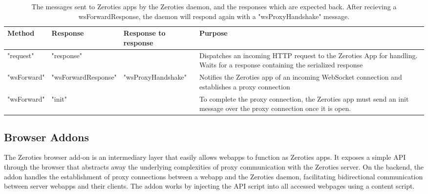 \begin{table*}[h]
    \small
    \centering
\begin{tabularx}{\textwidth}{|l|l|l|l|}
    \hline
Method      & Response            & Response to response & Purpose                                                                                                                       \\
\hline
"request"   & "response"          &                      & Dispatches an incoming HTTP request to the Zeroties App for handling. Waits for a response containing the serialized response \\
"wsForward" & "wsForwardResponse" & "wsProxyHandshake"   & Notifies the Zeroties app of an incoming WebSocket connection and establishes a proxy connection                              \\
"wsForward" & "init"              &                      & To complete the proxy connection, the Zeroties app must send an init message over the proxy connection once it is open.      \\
\hline
\end{tabularx}
\caption{The messages sent to Zeroties apps by the Zeroties daemon, and the responses which are expected back. After recieving a wsForwardResponse, the daemon will respond again with a "wsProxyHandshake" message.}
\label{tab:zeroties_protocol}
\end{table*}

\subsection{Browser Addons}
\label{sub:browser_addons}

The Zeroties browser add-on is an intermediary layer that easily allows webapps to function as Zeroties apps.
It exposes a simple API through the browser that abstracts away the underlying complexities of proxy communication with the Zeroties server.
On the backend, the addon handles the establishment of proxy connections between a webapp and the Zeroties daemon, facilitating bidirectional communication between server webapps and their clients.
The addon works by injecting the API script into all accessed webpages using a content script.

